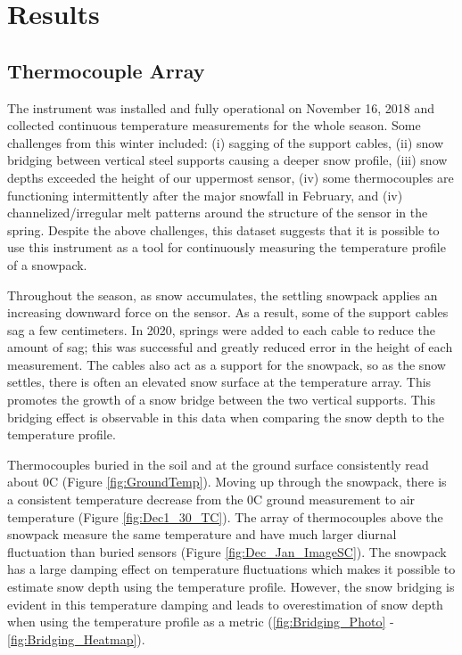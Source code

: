 \chapter{Results}
\section{Thermocouple Array}
The instrument was installed and fully operational on November 16, 2018 and collected continuous temperature measurements for the whole season. Some challenges from this winter included: (i) sagging of the support cables, (ii) snow bridging between vertical steel supports causing a deeper snow profile, (iii) snow depths exceeded the height of our uppermost sensor, (iv) some thermocouples are functioning intermittently after the major snowfall in February, and (iv) channelized/irregular melt patterns around the structure of the sensor in the spring. Despite the above challenges, this dataset suggests that it is possible to use this instrument as a tool for continuously measuring the temperature profile of a snowpack. 

Throughout the season, as snow accumulates, the settling snowpack applies an increasing downward force on the sensor. As a result, some of the support cables sag a few centimeters. In 2020, springs were added to each cable to reduce the amount of sag; this was successful and greatly reduced error in the height of each measurement. The cables also act as a support for the snowpack, so as the snow settles, there is often an elevated snow surface at the temperature array. This promotes the growth of a snow bridge between the two vertical supports. This bridging effect is observable in this data when comparing the snow depth to the temperature profile.   

Thermocouples buried in the soil and at the ground surface consistently read about 0\textdegree C (Figure \ref{fig:GroundTemp}). Moving up through the snowpack, there is a consistent temperature decrease from the 0\textdegree C ground measurement to air temperature (Figure \ref{fig:Dec1_30_TC}). The array of thermocouples above the snowpack measure the same temperature and have much larger diurnal fluctuation than buried sensors (Figure \ref{fig:Dec_Jan_ImageSC}). The snowpack has a large damping effect on temperature fluctuations which makes it possible to estimate snow depth using the temperature profile. However, the snow bridging is evident in this temperature damping and leads to overestimation of snow depth when using the temperature profile as a metric (\ref{fig:Bridging_Photo} - \ref{fig:Bridging_Heatmap}). 


